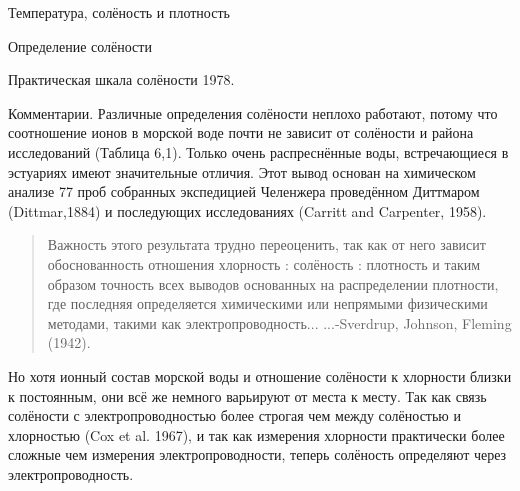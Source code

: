 \begin{chapter}{Температура, солёность и плотность}
\begin{section}{Определение солёности}
\begin{paragraph}{Практическая шкала солёности 1978.}
\end{paragraph} 

\begin{paragraph}{Комментарии.}
Различные определения солёности неплохо работают, потому что
соотношение ионов в морской воде почти не зависит от солёности и
района исследований (Таблица 6,1). Только очень распреснённые воды,
встречающиеся в эстуариях имеют значительные отличия. Этот вывод
основан на химическом анализе 77 проб собранных экспедицией Челенжера
проведённом Диттмаром (Dittmar,1884) и последующих исследованиях
(Carritt and Carpenter, 1958).
\begin{quotation}
Важность этого результата трудно переоценить, так как от него зависит
обоснованность отношения хлорность : солёность : плотность и таким
образом точность всех выводов основанных на распределении плотности,
где последняя определяется химическими или непрямыми физическими
методами, такими как электропроводность... ...-Sverdrup, Johnson,
Fleming (1942).
\end{quotation}
Но хотя ионный состав морской воды и отношение солёности к хлорности
близки к постоянным, они всё же немного варьируют от места к
месту. Так как связь солёности с электропроводностью более строгая чем
между солёностью и хлорностью (Cox et al. 1967), и так как измерения
хлорности практически более сложные чем измерения электропроводности,
теперь солёность определяют через электропроводность.
%

\end{paragraph}
\end{section}
\end{chapter}
